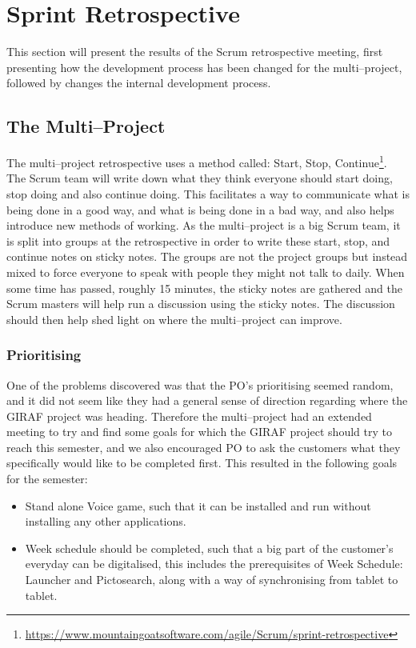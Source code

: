 \section{Sprint Retrospective}\label{s1retro}
This section will present the results of the Scrum retrospective meeting, first presenting how the development process has been changed for the multi--project, followed by changes the internal development process.

\subsection{The Multi--Project}\label{retro1}
The multi--project retrospective uses a method called: Start, Stop, Continue\footnote{\url{https://www.mountaingoatsoftware.com/agile/Scrum/sprint-retrospective}}.
The Scrum team will write down what they think everyone should start doing, stop doing and also continue doing.
This facilitates a way to communicate what is being done in a good way, and what is being done in a bad way, and also helps introduce new methods of working.
As the multi--project is a big Scrum team, it is split into groups at the retrospective in order to write these start, stop, and continue notes on sticky notes.
The groups are not the project groups but instead mixed to force everyone to speak with people they might not talk to daily.
When some time has passed, roughly 15 minutes, the sticky notes are gathered and the Scrum masters will help run a discussion using the sticky notes.
The discussion should then help shed light on where the multi--project can improve.

\subsubsection{Prioritising}
One of the problems discovered was that the PO's prioritising seemed random, and it did not seem like they had a general sense of direction regarding where the GIRAF project was heading.
Therefore the multi--project had an extended meeting to try and find some goals for which the GIRAF project should try to reach this semester, and we also encouraged PO to ask the customers what they specifically would like to be completed first.
This resulted in the following goals for the semester:
\begin{itemize}
	\item Stand alone Voice game, such that it can be installed and run without installing any other applications.
	\item Week schedule should be completed, such that a big part of the customer's everyday can be digitalised, this includes the prerequisites of Week Schedule: Launcher and Pictosearch, along with a way of synchronising from tablet to tablet.
\end{itemize}


